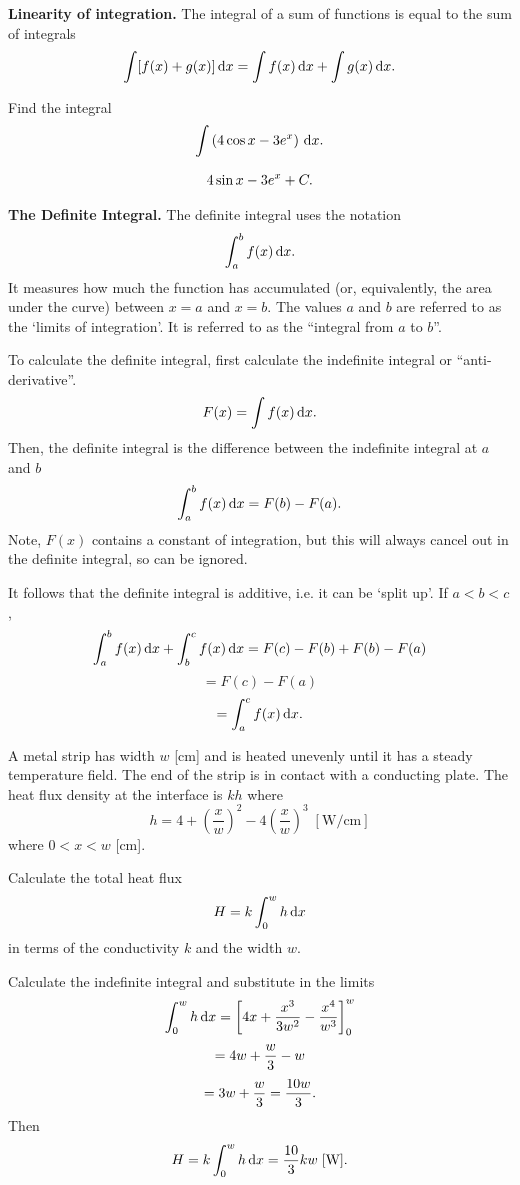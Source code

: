 \textbf{Linearity of integration.} The integral of a sum of functions is equal to the sum of integrals
\[
\int[f(x)+g(x)]\,{\rm d}x=\int f(x)\,{\rm d}x+\int g(x)\,{\rm d}x.
\]

\begin{example}[Lecture]
Find the integral
\[
\int\left(4\cos x-3e^x\right)\,{\rm d}x.
\]
\end{example}

\begin{solution}
\[
4\sin x-3e^x+C.
\]
\end{solution}

\textbf{The Definite Integral.} The definite integral uses the notation
\[
\int_a^b f(x)\,{\rm d}x.
\]
It measures how much the function has accumulated (or, equivalently, the area under the curve) between $x=a$ and $x=b$. The values $a$ and $b$ are referred to as the `limits of integration'. It is referred to as the ``integral from $a$ to $b$''.

To calculate the definite integral, first calculate the indefinite integral or  ``anti-derivative''.
\[
F(x)=\int f(x)\,{\rm d}x.
\]
Then, the definite integral is the difference between the indefinite integral at $a$ and $b$
\[
\int_a^b f(x)\,{\rm d}x=F(b)-F(a).
\]
Note, $F(x)$ contains a constant of integration, but this will always cancel out in the definite integral, so can be ignored.

It follows that the definite integral is additive, i.e. it can be `split up'. If $a<b<c$,
\[
\int_a^b f(x)\,{\rm d}x+\int_b^c f(x)\,{\rm d}x
=F(c)-F(b)+F(b)-F(a)
\]
\[
=F(c)-F(a)
\]
\[
=\int_a^c f(x)\,{\rm d}x.
\]

\begin{example}[Video]
A metal strip has width $w$ [cm] and is heated unevenly until it has a steady temperature field. The end of the strip is in contact with a conducting plate. The heat flux density at the interface is $kh$ where
\[
h=4+\left(\frac{x}{w}\right)^2-4\left(\frac{x}{w}\right)^3\;[\mathrm{W/cm}]
\]
where $0<x<w$ [cm].

Calculate the total heat flux
\[
H=k\int_0^w h\,{\rm d}x
\]
in terms of the conductivity $k$ and the width $w$.
\end{example}

\begin{solution}
Calculate the indefinite integral and substitute in the limits
\[
\int_0^w h\,{\rm d}x
=
\left[4x+\frac{x^3}{3w^2}-\frac{x^4}{w^3}\right]_0^w
\]
\[
=4w+\frac{w}{3}-w
\]
\[
=3w+\frac{w}{3}=\frac{10w}{3}.
\]
Then
\[
H=k\int_0^w h\,{\rm d}x=\frac{10}{3}kw\;[\mathrm{W}].
\]
\end{solution}

